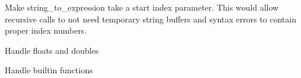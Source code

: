 \begin{DoxyItemize}
\item Make string\+\_\+to\+\_\+expression take a start index parameter. This would allow recursive calls to not need temporary string buffers and syntax errors to contain proper index numbers.
\item Handle floats and doubles
\item Handle builtin functions 
\end{DoxyItemize}